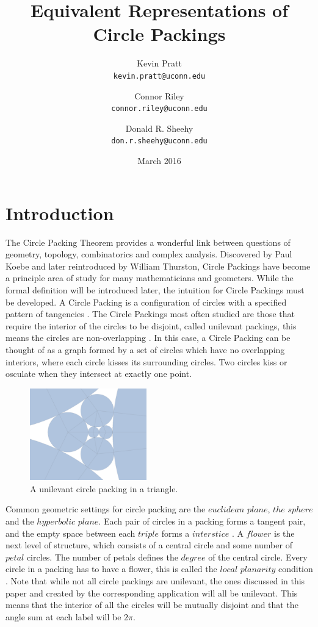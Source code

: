 \documentclass[11pt]{article}
\title{Equivalent Representations of Circle Packings}
\author{
  Kevin Pratt\\
  \texttt{kevin.pratt@uconn.edu}
  \and
  Connor Riley\\
  \texttt{connor.riley@uconn.edu}
    \and
  Donald R. Sheehy\\
  \texttt{don.r.sheehy@uconn.edu}
}\date{March 2016}
\begin{document}
\maketitle

\section{Introduction}
The Circle Packing Theorem provides a wonderful link between questions of geometry, topology, combinatorics and complex analysis. Discovered by Paul Koebe and later reintroduced by William Thurston, Circle Packings have become a principle area of study for many mathematicians and geometers. While the formal definition will be introduced later, the intuition for Circle Packings must be developed. A Circle Packing is a configuration of circles with a specified pattern of tangencies \cite{stephenson05introduction}. The Circle Packings most often studied are those that require the interior of the circles to be disjoint, called unilevant packings, this means the circles are non-overlapping \cite{stephenson05introduction}. In this case, a Circle Packing can be thought of as a graph formed by a set of circles which have no overlapping interiors, where each circle kisses its surrounding circles. Two circles kiss or osculate when they intersect at exactly one point. 

\begin{figure}
  \begin{center}
    \includegraphics[scale=.18,width=0.45\textwidth]{circlepacking_1}
  \end{center}
  \caption{A unilevant circle packing in a triangle.}
\end{figure}

Common geometric settings for circle packing are the $euclidean$ $plane$, $the$ $sphere$ and the $hyperbolic$ $plane$. Each pair of circles in a packing forms a tangent pair, and the empty space between each $triple$ forms a $interstice$ \cite{stephenson05introduction}. A $flower$ is the next level of structure, which consists of a central circle and some number of $petal$ circles. The number of petals defines the $degree$ of the central circle. Every circle in a packing has to have a flower, this is called the $local$ $planarity$ condition \cite{stephenson05introduction}. Note that while not all circle packings are unilevant, the ones discussed in this paper and created by the corresponding application will all be unilevant. This means that the interior of all the circles will be mutually disjoint and that the angle sum at each label will be $2\pi$.
\end{document}
